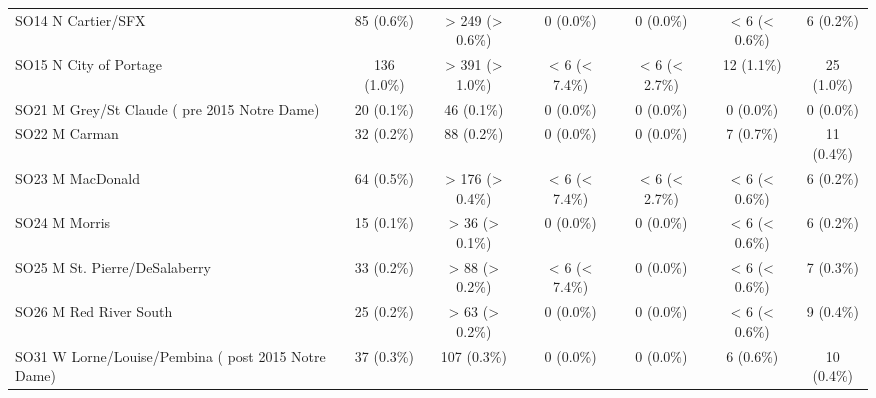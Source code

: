 \documentclass{article}
\begin{document}
\begin{table}[htbp]
\begin{tabular}{l*{6}{c}}
  SO14 N Cartier/SFX                                    &            85 (0.6\%)           &         > 249 (> 0.6\%)         &            0 (0.0\%)            &            0 (0.0\%)            &          < 6 (< 0.6\%)          &            6 (0.2\%)            \\
  SO15 N City of Portage                                &           136 (1.0\%)           &         > 391 (> 1.0\%)         &          < 6 (< 7.4\%)          &          < 6 (< 2.7\%)          &            12 (1.1\%)           &            25 (1.0\%)           \\
  SO21 M Grey/St Claude ( pre 2015 Notre Dame)          &            20 (0.1\%)           &            46 (0.1\%)           &            0 (0.0\%)            &            0 (0.0\%)            &            0 (0.0\%)            &            0 (0.0\%)            \\
  SO22 M Carman                                         &            32 (0.2\%)           &            88 (0.2\%)           &            0 (0.0\%)            &            0 (0.0\%)            &            7 (0.7\%)            &            11 (0.4\%)           \\
  SO23 M MacDonald                                      &            64 (0.5\%)           &         > 176 (> 0.4\%)         &          < 6 (< 7.4\%)          &          < 6 (< 2.7\%)          &          < 6 (< 0.6\%)          &            6 (0.2\%)            \\
  SO24 M Morris                                         &            15 (0.1\%)           &          > 36 (> 0.1\%)         &            0 (0.0\%)            &            0 (0.0\%)            &          < 6 (< 0.6\%)          &            6 (0.2\%)            \\
  SO25 M St. Pierre/DeSalaberry                         &            33 (0.2\%)           &          > 88 (> 0.2\%)         &          < 6 (< 7.4\%)          &            0 (0.0\%)            &          < 6 (< 0.6\%)          &            7 (0.3\%)            \\
  SO26 M Red River South                                &            25 (0.2\%)           &          > 63 (> 0.2\%)         &            0 (0.0\%)            &            0 (0.0\%)            &          < 6 (< 0.6\%)          &            9 (0.4\%)            \\
  SO31 W Lorne/Louise/Pembina ( post 2015 Notre Dame)   &            37 (0.3\%)           &           107 (0.3\%)           &            0 (0.0\%)            &            0 (0.0\%)            &            6 (0.6\%)            &            10 (0.4\%)           \\

\end{tabular}
\end{table}
\end{document}
